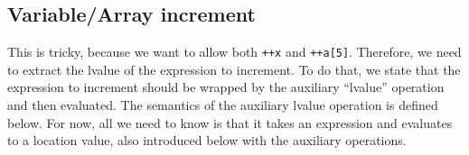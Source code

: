 \documentclass{article}
\begin{document}
\begin{kdefinition}
\begin{module}{}
\begin{kblock}[text]
 \subsection{Variable/Array increment}
This is tricky, because we want to allow both {\tt ++x} and {\tt ++a[5]}.
Therefore, we need to extract the lvalue of the expression to increment.
To do that, we state that the expression to increment should be wrapped
by the auxiliary ``lvalue'' operation and then evaluated.
The semantics of the auxiliary lvalue operation is defined below.
For now, all we need to know is that it takes an expression and evaluates
to a location value, also introduced below with the auxiliary operations. \end{kblock}
\begin{kblock}[text]

\end{kblock}
\end{module}
\end{kdefinition}
\end{document}
